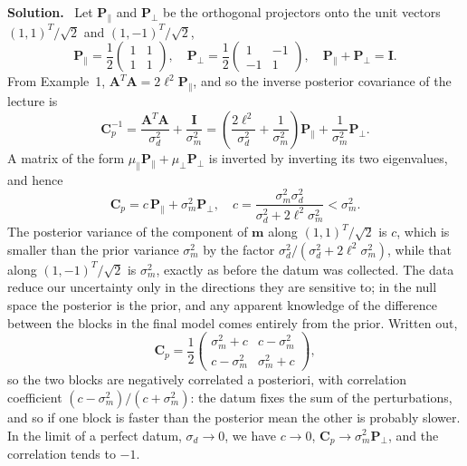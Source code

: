 \documentclass[a4paper,12pt]{paper}
\newenvironment{solution}{\par\noindent\textbf{Solution.}\ }{\par\medskip}
\begin{document}
\begin{solution}
Let $\mathbf{P}_{\parallel}$ and $\mathbf{P}_{\perp}$ be the orthogonal projectors onto the unit
vectors $(1,1)^{T}/\sqrt{2}$ and $(1,-1)^{T}/\sqrt{2}$,
\begin{equation}
    \mathbf{P}_{\parallel} = \frac{1}{2}\begin{pmatrix} 1 & 1 \\ 1 & 1 \end{pmatrix},\quad
    \mathbf{P}_{\perp} = \frac{1}{2}\begin{pmatrix} 1 & -1 \\ -1 & 1 \end{pmatrix},\quad
    \mathbf{P}_{\parallel}+\mathbf{P}_{\perp} = \mathbf{I}.
    \label{eq:26}
\end{equation}
From Example~1, $\mathbf{A}^{T}\mathbf{A} = 2\ell^{2}\mathbf{P}_{\parallel}$, and so the inverse posterior
covariance of the lecture is
\begin{equation}
    \mathbf{C}_{p}^{-1} = \frac{\mathbf{A}^{T}\mathbf{A}}{\sigma_{d}^{2}} + \frac{\mathbf{I}}{\sigma_{m}^{2}}
    = \left(\frac{2\ell^{2}}{\sigma_{d}^{2}}+\frac{1}{\sigma_{m}^{2}}\right)\mathbf{P}_{\parallel}
    + \frac{1}{\sigma_{m}^{2}}\mathbf{P}_{\perp}.
    \label{eq:27}
\end{equation}
A matrix of the form $\mu_{\parallel}\mathbf{P}_{\parallel}+\mu_{\perp}\mathbf{P}_{\perp}$ is inverted by
inverting its two eigenvalues, and hence
\begin{equation}
    \mathbf{C}_{p} = c\,\mathbf{P}_{\parallel} + \sigma_{m}^{2}\mathbf{P}_{\perp},\quad
    c = \frac{\sigma_{m}^{2}\sigma_{d}^{2}}{\sigma_{d}^{2}+2\ell^{2}\sigma_{m}^{2}} < \sigma_{m}^{2}.
    \label{eq:28}
\end{equation}
The posterior variance of the component of $\mathbf{m}$ along $(1,1)^{T}/\sqrt{2}$ is $c$, which is
smaller than the prior variance $\sigma_{m}^{2}$ by the factor $\sigma_{d}^{2}/(\sigma_{d}^{2}+2\ell^{2}\sigma_{m}^{2})$,
while that along $(1,-1)^{T}/\sqrt{2}$ is $\sigma_{m}^{2}$, exactly as before the datum was collected.
The data reduce our uncertainty only in the directions they are sensitive to; in the null space the
posterior is the prior, and any apparent knowledge of the difference between the blocks in the
final model comes entirely from the prior. Written out,
\begin{equation}
    \mathbf{C}_{p} = \frac{1}{2}\begin{pmatrix} \sigma_{m}^{2}+c & c-\sigma_{m}^{2} \\
    c-\sigma_{m}^{2} & \sigma_{m}^{2}+c \end{pmatrix},
    \label{eq:29}
\end{equation}
so the two blocks are negatively correlated a posteriori, with correlation coefficient
$(c-\sigma_{m}^{2})/(c+\sigma_{m}^{2})$: the datum fixes the sum of the perturbations, and so if one
block is faster than the posterior mean the other is probably slower. In the limit of a perfect
datum, $\sigma_{d}\to0$, we have $c\to0$, $\mathbf{C}_{p}\to\sigma_{m}^{2}\mathbf{P}_{\perp}$, and the
correlation tends to $-1$.


\end{solution}
\end{document}
